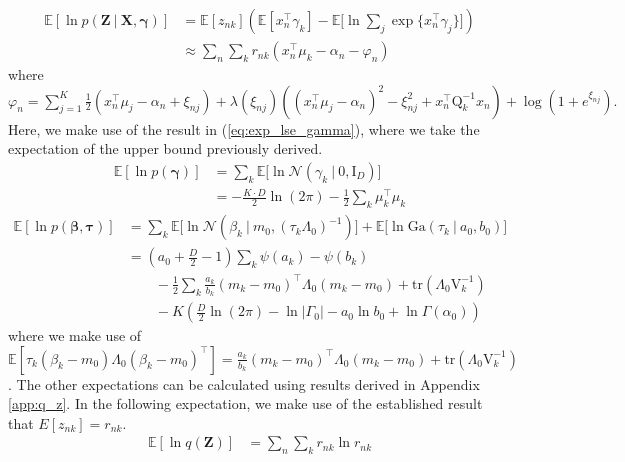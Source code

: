 \documentclass[twoside,11pt]{article}
\newcommand{\tr}{\intercal}
\newcommand{\eye}{\mathrm{I}}
\newcommand\given[1][]{\:#1\vert\:}
\newcommand{\transpose}[1]{#1^{\intercal}}
\newcommand{\nsum}{\sum_{n}}
\newcommand{\ksum}{\sum_{k}}
\newcommand{\boldbeta}{\boldsymbol\beta}
\newcommand{\boldgamma}{\boldsymbol\gamma}
\newcommand{\boldtau}{\boldsymbol\tau}
\newcommand{\E}{\mathbb{E}}
\newcommand{\pr}[1]{p \left( #1 \right)}
\begin{document}
\begin{equation} \label{eq:e2_deriv}
\begin{split}
	\E[\ln \pr{\mathbf{Z} \given \mathbf{X}, \boldgamma}] &= \E[z_{nk}] \left( \E[\transpose{x_n} \gamma_k] - \E\Big[\ln \sum_{j} \exp \{ \transpose{x_n}\gamma_j\}\Big]\right)\\
	&\approx \nsum \ksum r_{nk} \left( \transpose{x_n}\mu_k - \alpha_n - \varphi_n \right)
\end{split}
\end{equation}
where $\varphi_n = \sum\limits_{j=1}^K \frac{1}{2}\left(x_n^{\tr}\mu_j - \alpha_n + \xi_{nj}\right) + \lambda(\xi_{nj}) \left( (x_n^{\tr} \mu_j - \alpha_n)^2 - \xi_{nj}^2 + x_n^{\tr} \mathrm{Q}_k^{-1} x_n \right) + \log( 1 + e^{\xi_{nj}}).$
Here, we make use of the result in (\ref{eq:exp_lse_gamma}), where we take the expectation of the upper bound previously derived. 
\begin{equation} \label{eq:e3_deriv}
\begin{split}
	\E[\ln \pr{\boldgamma}] &= \ksum \E \Big[ \ln \mathcal{N}\left( \gamma_k \given 0, \eye_D\right)\Big] \\
	&= -\frac{K \cdot D}{2} \ln (2\pi) - \frac{1}{2} \ksum \transpose{\mu_k}\mu_k
\end{split}
\end{equation}
\begin{equation} \label{eq:e4_deriv} %
\begin{split}
	\E[\ln \pr{\boldbeta, \boldtau}] &= \ksum \E\Big[\ln \mathcal{N}\left( \beta_k \given m_0, \left(\tau_k \Lambda_0 \right)^{-1} \right)\Big] + \E\Big[\ln \mathrm{Ga}\left( \tau_k \given a_0, b_0\right)\Big]\\
	&= \left( a_0 + \frac{D}{2} - 1 \right) \ksum \psi(a_k) - \psi(b_k)  \\
	& \qquad - \frac{1}{2} \ksum \frac{a_k}{b_k} \transpose{(m_k - m_0)} \Lambda_0 (m_k - m_0) + \mathrm{tr} \left( \Lambda_0 \mathrm{V}_{k}^{-1}\right)\\
	& \qquad - K \left(\frac{D}{2}\ln(2\pi)  - \ln |\Gamma_0| - a_0 \ln b_0 + \ln \Gamma(\alpha_0) \right)
\end{split}
\end{equation}
where we make use of $\E[\tau_k\transpose{(\beta_k - m_0) \Lambda_0 (\beta_k - m_0)}] =  \frac{a_k}{b_k} \transpose{(m_k - m_0)} \Lambda_0 (m_k - m_0) + \mathrm{tr} \left( \Lambda_0 \mathrm{V}_{k}^{-1}\right)$. The other expectations can be calculated using results derived in Appendix \ref{app:q_z}. In the following expectation, we make use of the established result that $E[z_{nk}] = r_{nk}$. 
\begin{equation} \label{eq:e5_deriv}
\begin{split}
	\E[\ln q(\mathbf{Z})] &=  \nsum \ksum r_{nk} \ln r_{nk}
\end{split}
\end{equation}
\end{document}
